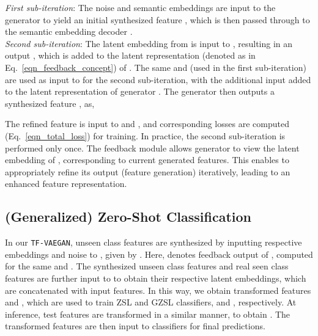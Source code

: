 \documentclass[runningheads]{llncs}
\newcommand{\proposed}{\texttt{TF-VAEGAN}}
\begin{document}
\noindent \textit{First sub-iteration}: The noise  and semantic embeddings  are input to the generator  to yield an initial synthesized feature , which is then passed through to the semantic embedding decoder . \\
\noindent \textit{Second sub-iteration}: The latent embedding  from  is input to , resulting in an output , which is added to the latent representation (denoted as  in Eq.~\ref{eqn_feedback_concept}) of . The same  and  (used in the first sub-iteration) are used as input to  for the second sub-iteration, with the additional input  added to the latent representation  of generator . The generator then outputs a synthesized feature , as,

The refined feature  is input to  and , and corresponding losses are computed (Eq.~\ref{eqn_total_loss}) for training. In practice, the second sub-iteration is performed only once.
The feedback module  allows generator  to view the latent embedding of , corresponding to current generated features. This enables  to appropriately refine its output (feature generation) iteratively, leading to an enhanced feature representation.

\subsection{(Generalized) Zero-Shot Classification}
In our \proposed, unseen class features are synthesized by inputting respective embeddings  and noise  to , given by . Here,  denotes feedback output of , computed for the same  and . The synthesized unseen class features  and real seen class features  are further input to  to obtain their respective latent embeddings, which are concatenated with input features. In this way, we obtain transformed features  and , which are used to train ZSL and GZSL classifiers,  and , respectively. At inference, test features  are transformed in a similar manner, to obtain . The transformed features are then input to classifiers for final predictions.
\end{document}
